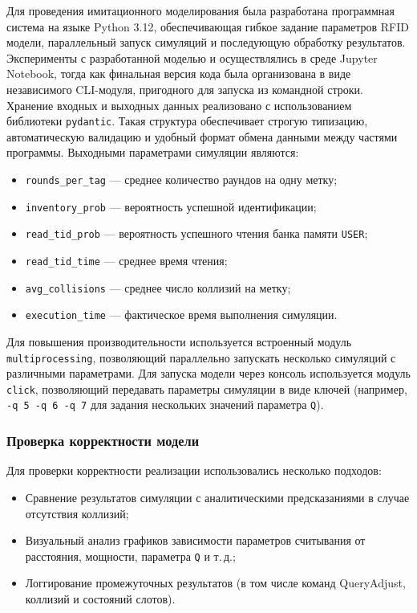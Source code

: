 \documentclass[12pt]{article}
\theoremstyle{definition}
\begin{document}
Для проведения имитационного моделирования была разработана программная система на языке Python 3.12, обеспечивающая гибкое задание параметров RFID модели, параллельный запуск симуляций и последующую обработку результатов. Эксперименты с разработанной моделью и  осуществлялись в среде Jupyter Notebook, тогда как финальная версия кода была организована в виде независимого CLI-модуля, пригодного для запуска из командной строки.
Хранение входных и выходных данных реализовано с использованием библиотеки \texttt{pydantic}. Такая структура обеспечивает строгую типизацию, автоматическую валидацию и удобный формат обмена данными между частями программы. Выходными параметрами симуляции являются: 

\begin{itemize}
  \item \texttt{rounds\_per\_tag} — среднее количество раундов на одну метку;
  \item \texttt{inventory\_prob} — вероятность успешной идентификации;
  \item \texttt{read\_tid\_prob} — вероятность успешного чтения банка памяти \texttt{USER};
  \item \texttt{read\_tid\_time} — среднее время чтения;
  \item \texttt{avg\_collisions} — среднее число коллизий на метку;
  \item \texttt{execution\_time} — фактическое время выполнения симуляции.
\end{itemize}

Для повышения производительности используется встроенный модуль \texttt{multiprocessing}, позволяющий параллельно запускать несколько симуляций с различными параметрами. Для запуска модели через консоль используется модуль \texttt{click}, позволяющий передавать параметры симуляции в виде ключей (например, \texttt{-q 5 -q 6 -q 7} для задания нескольких значений параметра \texttt{Q}).

\subsubsection{Проверка корректности модели}

Для проверки корректности реализации использовались несколько подходов:
\begin{itemize}
  \item Сравнение результатов симуляции с аналитическими предсказаниями в случае отсутствия коллизий;
  \item Визуальный анализ графиков зависимости параметров считывания от расстояния, мощности, параметра \texttt{Q} и т.\,д.;
  \item Логгирование промежуточных результатов (в том числе команд QueryAdjust, коллизий и состояний слотов).
\end{itemize}
\end{document}

